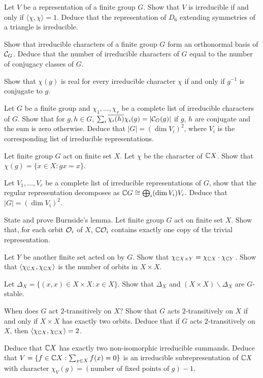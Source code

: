 \begin{question}{24}
	Let $V$ be a representation of a finite group $G$. Show that $V$ is irreducible if and only if $\langle \chi, \chi \rangle = 1$. Deduce that the representation of $D_6$ extending symmetries of a triangle is irreducible.
\end{question}

\begin{question}{25}
	Show that irreducible characters of a finite group $G$ form an orthonormal basis of $\mathcal{C}_G$. 
	Deduce that the number of irreducible characters of $G$ equal to the number of conjugacy classes of $G$.
	
	Show that $\chi(g)$ is real for every irreducible character $\chi$ if and only if $g^{-1}$ is conjugate to $g$.
\end{question}

\begin{question}{26}
	Let $G$ be a finite group and $\chi_1,\dots,\chi_r$ be a complete list of irreducible characters of $G$. Show that for $g,h\in G$, $\sum_i \overline{\chi_i(h)} \chi_i(g) = |\mathcal{C}_G(g)|$ if $g$, $h$ are conjugate and the sum is zero otherwise.
	Deduce that $|G| = (\dim V_i)^2$, where $V_i$ is the corresponding list of irreducible representations.
\end{question}

\begin{question}{27}
	Let finite group $G$ act on finite set $X$.  Let $\chi$ be the character of $\mathbb{C} X$. Show that $\chi(g) = \{x\in X : gx = x\}$.
	
	Let $V_1,\dots,V_r$ be a complete list of irreducible representations of $G$, show that the regular representation decomposes as $\mathbb{C} G \cong \bigoplus_i (\dim V_i)V_i$. Deduce that $|G| = (\dim V_i)^2$.
\end{question}

\begin{question}{28}
	State and prove Burnside's lemma. Let finite group $G$ act on finite set $X$.  Show that, for each orbit $\mathcal{O}_i$ of $X$, $\mathbb{C} \mathcal{O}_i$ contains exactly one copy of the trivial representation.
	
	Let $Y$ be another finite set acted on by $G$. Show that $\chi_{\mathbb{C} X\times Y} = \chi_{\mathbb{C} X}\cdot \chi_{\mathbb{C} Y}$. Show that $\langle \chi_{\mathbb{C} X}, \chi_{\mathbb{C} X} \rangle$ is the number of orbits in $X \times X$.
	
	Let $\Delta_X = \{(x,x)\in X\times X: x\in X\}$. Show that $\Delta_X$ and $(X\times X) \backslash \Delta_X$ are $G$-stable.
	
	When does $G$ act $2$-transitively on $X$? Show that $G$ acts $2$-transitively on $X$ if and only if $X\times X$ has exactly two orbits. 
	Deduce that if $G$ acts $2$-transitively on $X$, then $\langle \chi_{\mathbb{C} X},\chi_{\mathbb{C} X} \rangle = 2$.
	
	Deduce that $\mathbb{C} X$ has exactly two non-isomorphic irreducible summands. Deduce that $V = \{f\in \mathbb{C} X : \sum_{x\in X} f(x) = 0\}$ is an irreducible subrepresentation of $\mathbb{C} X$ with character $\chi_V(g) = (\text{number of fixed points of }g) -1$.
\end{question}

